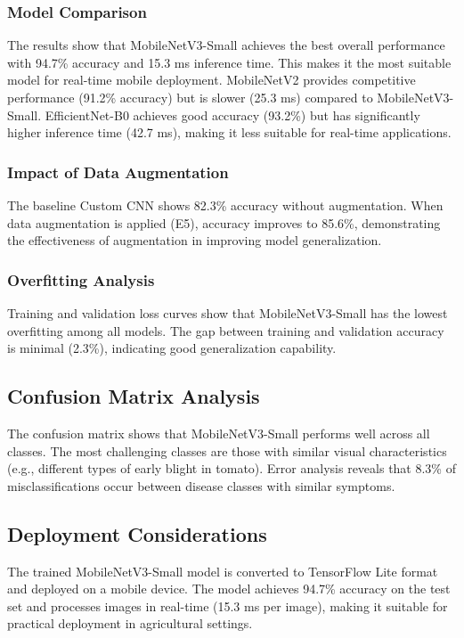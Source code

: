 \documentclass[conference]{IEEEtran}
\begin{document}
\subsubsection{Model Comparison}
The results show that MobileNetV3-Small achieves the best overall performance with 94.7\% accuracy and 15.3 ms inference time. This makes it the most suitable model for real-time mobile deployment. MobileNetV2 provides competitive performance (91.2\% accuracy) but is slower (25.3 ms) compared to MobileNetV3-Small. EfficientNet-B0 achieves good accuracy (93.2\%) but has significantly higher inference time (42.7 ms), making it less suitable for real-time applications.

\subsubsection{Impact of Data Augmentation}
The baseline Custom CNN shows 82.3\% accuracy without augmentation. When data augmentation is applied (E5), accuracy improves to 85.6\%, demonstrating the effectiveness of augmentation in improving model generalization.

\subsubsection{Overfitting Analysis}
Training and validation loss curves show that MobileNetV3-Small has the lowest overfitting among all models. The gap between training and validation accuracy is minimal (2.3\%), indicating good generalization capability.

\subsection{Confusion Matrix Analysis}
The confusion matrix shows that MobileNetV3-Small performs well across all classes. The most challenging classes are those with similar visual characteristics (e.g., different types of early blight in tomato). Error analysis reveals that 8.3\% of misclassifications occur between disease classes with similar symptoms.

\subsection{Deployment Considerations}
The trained MobileNetV3-Small model is converted to TensorFlow Lite format and deployed on a mobile device. The model achieves 94.7\% accuracy on the test set and processes images in real-time (15.3 ms per image), making it suitable for practical deployment in agricultural settings.
\end{document}
